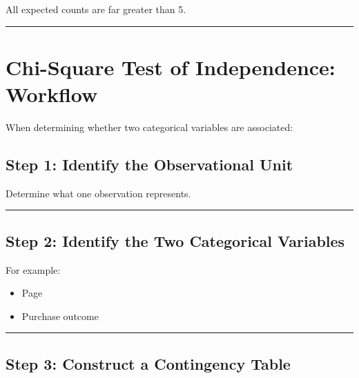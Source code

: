\documentclass[
  letterpaper,
  DIV=11,
  numbers=noendperiod]{scrreprt}
\newenvironment{Shaded}{\begin{snugshade}}{\end{snugshade}}
\newcommand{\AttributeTok}[1]{\textcolor[rgb]{0.40,0.45,0.13}{#1}}
\newcommand{\FunctionTok}[1]{\textcolor[rgb]{0.28,0.35,0.67}{#1}}
\newcommand{\NormalTok}[1]{\textcolor[rgb]{0.00,0.23,0.31}{#1}}
\newcommand{\SpecialCharTok}[1]{\textcolor[rgb]{0.37,0.37,0.37}{#1}}
\providecommand{\tightlist}{%
  \setlength{\itemsep}{0pt}\setlength{\parskip}{0pt}}
\begin{document}
All expected counts are far greater than 5.

\begin{center}\rule{0.5\linewidth}{0.5pt}\end{center}


\chapter{Chi-Square Test of Independence:
Workflow}\label{chi-square-test-of-independence-workflow}

When determining whether two categorical variables are associated:

\section{Step 1: Identify the Observational
Unit}\label{step-1-identify-the-observational-unit-1}

Determine what one observation represents.

\begin{center}\rule{0.5\linewidth}{0.5pt}\end{center}

\section{Step 2: Identify the Two Categorical
Variables}\label{step-2-identify-the-two-categorical-variables}

For example:

\begin{itemize}
\tightlist
\item
  Page
\item
  Purchase outcome
\end{itemize}

\begin{center}\rule{0.5\linewidth}{0.5pt}\end{center}

\section{Step 3: Construct a Contingency
Table}\label{step-3-construct-a-contingency-table}

\begin{Shaded}
\end{Shaded}
\end{document}
